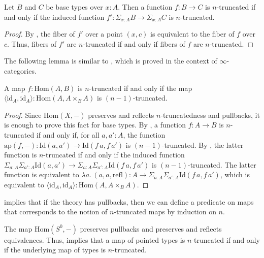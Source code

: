 \documentclass[reqno]{mscs}
\newcommand{\fs}[1]{\mathrm{#1}}
\newcommand{\Hom}{\fs{Hom}}
\newcommand{\Id}{\fs{Id}}
\newcommand{\refl}{\fs{refl}}
\newcommand{\id}{\fs{id}}
\newcommand{\pmap}{\fs{ap}}
\numberwithin{figure}{section}
\begin{document}
\begin{lem}
Let $B$ and $C$ be base types over $x : A$.
Then a function $f : B \to C$ is $n$-truncated if and only if the induced function $f' : \Sigma_{x : A} B \to \Sigma_{x : A} C$ is $n$-truncated.
\end{lem}
\begin{proof}
By \cite[Theorem~4.7.6]{hottbook}, the fiber of $f'$ over a point $(x,c)$ is equivalent to the fiber of $f$ over $c$.
Thus, fibers of $f'$ are $n$-truncated if and only if fibers of $f$ are $n$-truncated.
\end{proof}

The following lemma is similar to \cite[Lemma~5.5.6.15]{lurie-topos}, which is proved in the context of $\infty$-categories.

\begin{lem}[trunc-id]
A map $f : \Hom(A,B)$ is $n$-truncated if and only if the map $\langle \id_A, \id_A \rangle : \Hom(A, A \times_B A)$ is $(n-1)$-truncated.
\end{lem}
\begin{proof}
Since $\Hom(X,-)$ preserves and reflects $n$-truncatedness and pullbacks, it is enough to prove this fact for base types.
By \cite[Lemma~7.6.2]{hottbook}, a function $f : A \to B$ is $n$-truncated if and only if, for all $a,a' : A$, the function $\pmap(f,-) : \Id(a,a') \to \Id(f\,a,f\,a')$ is $(n-1)$-truncated.
By , the latter function is $n$-truncated if and only if the induced function $\Sigma_{a : A} \Sigma_{a' : A} \Id(a,a') \to \Sigma_{a : A} \Sigma_{a' : A} \Id(f\,a,f\,a')$ is $(n-1)$-truncated.
The latter function is equivalent to $\lambda a.\,(a,a,\refl) : A \to \Sigma_{a : A} \Sigma_{a' : A} \Id(f\,a,f\,a')$, which is equivalent to $\langle \id_A, \id_A \rangle : \Hom(A, A \times_B A)$.
\end{proof}

 implies that if the theory has pullbacks, then we can define a predicate on maps that corresponds to the notion of $n$-truncated maps by induction on $n$.

\begin{example}
The map $\Hom(S^0,-)$ preserves pullbacks and preserves and reflects equivalences.
Thus,  implies that a map of pointed types is $n$-truncated if and only if the underlying map of types is $n$-truncated.
\end{example}
\end{document}
